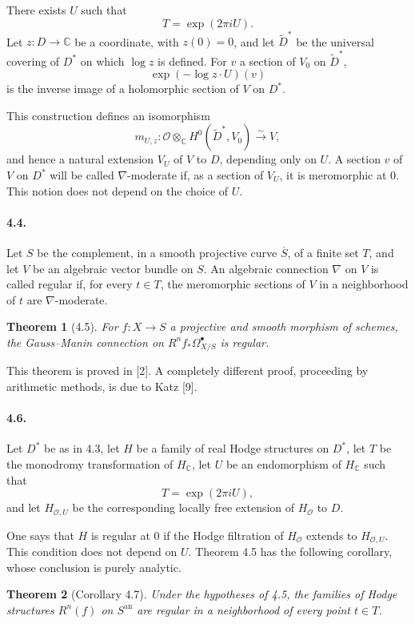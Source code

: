 \documentclass[10pt]{article}
\newcommand{\C}{\mathbb C}
\newcommand{\cO}{\mathcal O}
\theoremstyle{deligne}
\newtheorem*{theorem}{Theorem}
\begin{document}
There exists $U$ such that
\[
  T=\exp(2\pi iU).
\]
Let $z:D\to\C$ be a coordinate, with $z(0)=0$, and let $\widetilde D^*$ be the universal covering of $D^*$ on which $\log z$ is defined. For $v$ a section of $V_0$ on $\widetilde D^*$,
\[
  \exp(-\log z\cdot U)(v)
\]
is the inverse image of a holomorphic section of $V$ on $D^*$.

This construction defines an isomorphism
\[
  m_{U,z}:\cO\otimes_\C H^0(\widetilde D^*,V_0)
  \xrightarrow{\sim} V,
\]
and hence a natural extension $V_U$ of $V$ to $D$, depending only on $U$. A section $v$ of $V$ on $D^*$ will be called $\nabla$-moderate if, as a section of $V_U$, it is meromorphic at $0$. This notion does not depend on the choice of $U$.

\paragraph{4.4.}
Let $S$ be the complement, in a smooth projective curve $\overline S$, of a finite set $T$, and let $V$ be an algebraic vector bundle on $S$. An algebraic connection $\nabla$ on $V$ is called regular if, for every $t\in T$, the meromorphic sections of $V$ in a neighborhood of $t$ are $\nabla$-moderate.

\begin{theorem}[4.5]
For $f:X\to S$ a projective and smooth morphism of schemes, the Gauss--Manin connection on $R^n f_*\Omega^\bullet_{X/S}$ is regular.
\end{theorem}

This theorem is proved in [2]. A completely different proof, proceeding by arithmetic methods, is due to Katz [9].

\paragraph{4.6.}
Let $D^*$ be as in 4.3, let $H$ be a family of real Hodge structures on $D^*$, let $T$ be the monodromy transformation of $H_\C$, let $U$ be an endomorphism of $H_\C$ such that
\[
  T=\exp(2\pi iU),
\]
and let $H_{\cO,U}$ be the corresponding locally free extension of $H_\cO$ to $D$.

One says that $H$ is regular at $0$ if the Hodge filtration of $H_\cO$ extends to $H_{\cO,U}$. This condition does not depend on $U$. Theorem 4.5 has the following corollary, whose conclusion is purely analytic.

\begin{theorem}[Corollary 4.7]
Under the hypotheses of 4.5, the families of Hodge structures $R^n(f)$ on $S^{\mathrm{an}}$ are regular in a neighborhood of every point $t\in T$.
\end{theorem}
\end{document}

